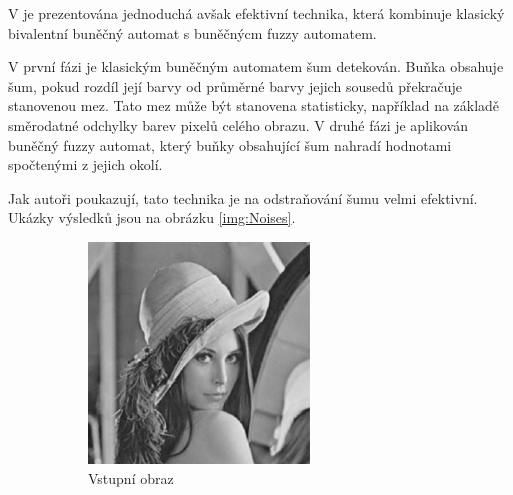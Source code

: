 \documentclass[a4paper,10pt]{article}
\begin{document}
V \cite{SadRetKam-EfMetImpNoiRedImFuzCelAut} je prezentována jednoduchá avšak efektivní technika, která kombinuje klasický bivalentní buněčný automat s buněčnýcm fuzzy automatem. 

V první fázi je klasickým buněčným automatem šum detekován. Buňka obsahuje šum, pokud rozdíl její barvy od průměrné barvy jejich sousedů překračuje stanovenou mez. Tato mez může být stanovena statisticky, například na základě směrodatné odchylky barev pixelů celého obrazu. V druhé fázi je aplikován buněčný fuzzy automat, který buňky obsahující šum nahradí hodnotami spočtenými z jejich okolí. 

Jak autoři poukazují, tato technika je na odstraňování šumu velmi efektivní. Ukázky výsledků jsou na obrázku \ref{img:Noises}. 

\begin{figure}
   \begin{subfigure}[t]{0.3\textwidth}
      \includegraphics[width=\textwidth]{noises1}
      \caption{Vstupní obraz}  
    \end{subfigure}%
%
    \begin{subfigure}[t]{0.3\textwidth}

\end{subfigure}
\end{figure}
\end{document}
